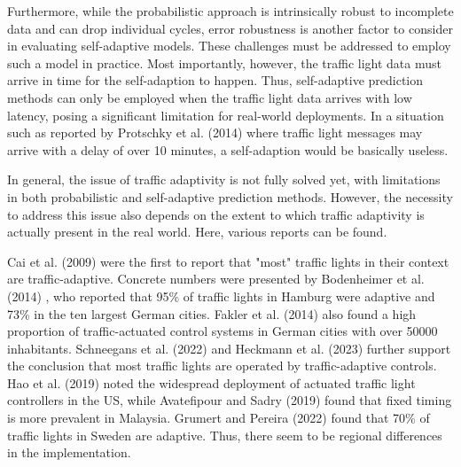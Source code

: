 Furthermore, while the probabilistic approach is intrinsically robust to incomplete data and can drop individual cycles, error robustness is another factor to consider in evaluating self-adaptive models. These challenges must be addressed to employ such a model in practice. Most importantly, however, the traffic light data must arrive in time for the self-adaption to happen. Thus, self-adaptive prediction methods can only be employed when the traffic light data arrives with low latency, posing a significant limitation for real-world deployments. In a situation such as reported by Protschky et al. (2014) \cite{protschky_extensive_2014, protschky_adaptive_2014} where traffic light messages may arrive with a delay of over 10 minutes, a self-adaption would be basically useless.

In general, the issue of traffic adaptivity is not fully solved yet, with limitations in both probabilistic and self-adaptive prediction methods. However, the necessity to address this issue also depends on the extent to which traffic adaptivity is actually present in the real world. Here, various reports can be found.

Cai et al. (2009) \cite{cai_adaptive_2009} were the first to report that "most" traffic lights in their context are traffic-adaptive. Concrete numbers were presented by Bodenheimer et al. (2014) \cite{bodenheimer_enabling_2014}, who reported that 95\% of traffic lights in Hamburg were adaptive and 73\% in the ten largest German cities. Fakler et al. (2014) \cite{fakler_structures_2014} also found a high proportion of traffic-actuated control systems in German cities with over 50000 inhabitants. Schneegans et al. (2022) \cite{scheegans_exploiting_2022} and Heckmann et al. (2023) \cite{heckmann_stage_2023} further support the conclusion that most traffic lights are operated by traffic-adaptive controls. Hao et al. (2019) \cite{hao_eco-approach_2019} noted the widespread deployment of actuated traffic light controllers in the US, while Avatefipour and Sadry (2019) \cite{avatefipour_traffic_2018} found that fixed timing is more prevalent in Malaysia. Grumert and Pereira (2022) \cite{grumert_heads-up_2022} found that 70\% of traffic lights in Sweden are adaptive. Thus, there seem to be regional differences in the implementation.

